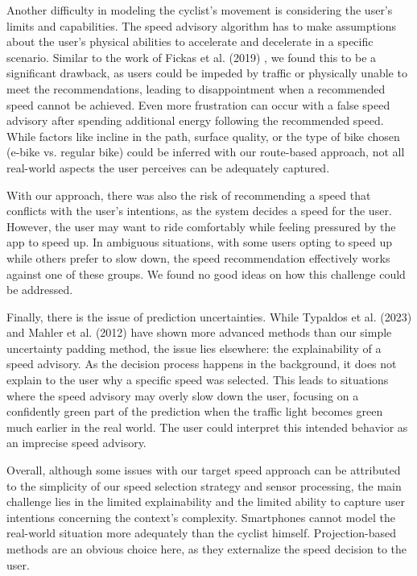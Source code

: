 Another difficulty in modeling the cyclist's movement is considering the user's limits and capabilities. The speed advisory algorithm has to make assumptions about the user's physical abilities to accelerate and decelerate in a specific scenario. Similar to the work of Fickas et al. (2019) \cite{fickas_fast_2019}, we found this to be a significant drawback, as users could be impeded by traffic or physically unable to meet the recommendations, leading to disappointment when a recommended speed cannot be achieved. Even more frustration can occur with a false speed advisory after spending additional energy following the recommended speed. While factors like incline in the path, surface quality, or the type of bike chosen (e-bike vs. regular bike) could be inferred with our route-based approach, not all real-world aspects the user perceives can be adequately captured.

With our approach, there was also the risk of recommending a speed that conflicts with the user's intentions, as the system decides a speed for the user. However, the user may want to ride comfortably while feeling pressured by the app to speed up. In ambiguous situations, with some users opting to speed up while others prefer to slow down, the speed recommendation effectively works against one of these groups. We found no good ideas on how this challenge could be addressed.

Finally, there is the issue of prediction uncertainties. While Typaldos et al. (2023) \cite{typaldos_modified_2023} and Mahler et al. (2012) \cite{mahler_reducing_2012} have shown more advanced methods than our simple uncertainty padding method, the issue lies elsewhere: the explainability of a speed advisory. As the decision process happens in the background, it does not explain to the user why a specific speed was selected. This leads to situations where the speed advisory may overly slow down the user, focusing on a confidently green part of the prediction when the traffic light becomes green much earlier in the real world. The user could interpret this intended behavior as an imprecise speed advisory.

Overall, although some issues with our target speed approach can be attributed to the simplicity of our speed selection strategy and sensor processing, the main challenge lies in the limited explainability and the limited ability to capture user intentions concerning the context's complexity. Smartphones cannot model the real-world situation more adequately than the cyclist himself. Projection-based methods are an obvious choice here, as they externalize the speed decision to the user.

